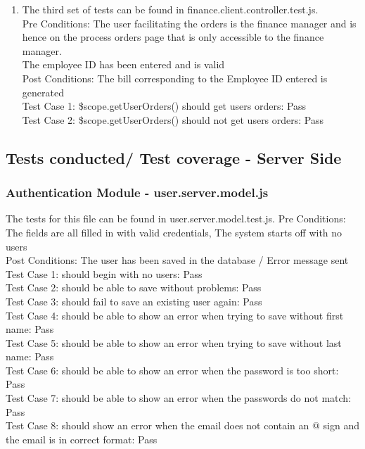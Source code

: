 \documentclass[a4paper,12pt]{report}
\begin{document}
\begin{enumerate}
\item The third set of tests can be found in finance.client.controller.test.js.\\
Pre Conditions: The user facilitating the orders is the finance manager and is hence on the process orders page that is only accessible to the finance manager. \\ The employee ID has been entered and is valid\\
Post Conditions: The bill corresponding to the Employee ID entered is generated\\
Test Case 1: \$scope.getUserOrders() should get users orders: Pass\\
Test Case 2: \$scope.getUserOrders() should not get users orders: Pass \\

\end{enumerate}

\subsection{Tests conducted/ Test coverage - Server Side}

\subsubsection{Authentication Module - user.server.model.js}
The tests for this file can be found in user.server.model.test.js.
Pre Conditions: The fields are all filled in with valid credentials, The system starts off with no users \\
Post Conditions: The user has been saved in the database /  Error message sent\\ 
Test Case 1: should begin with no users: Pass\\
Test Case 2: should be able to save without problems: Pass\\
Test Case 3: should fail to save an existing user again: Pass\\
Test Case 4: should be able to show an error when trying to save without first name: Pass\\
Test Case 5: should be able to show an error when trying to save without last name: Pass\\
Test Case 6: should be able to show an error when the password is too short: Pass\\
Test Case 7: should be able to show an error when the passwords do not match: Pass\\
Test Case 8: should show an error when the email does not contain an @ sign and the email is in correct format: Pass\\
\end{document}
